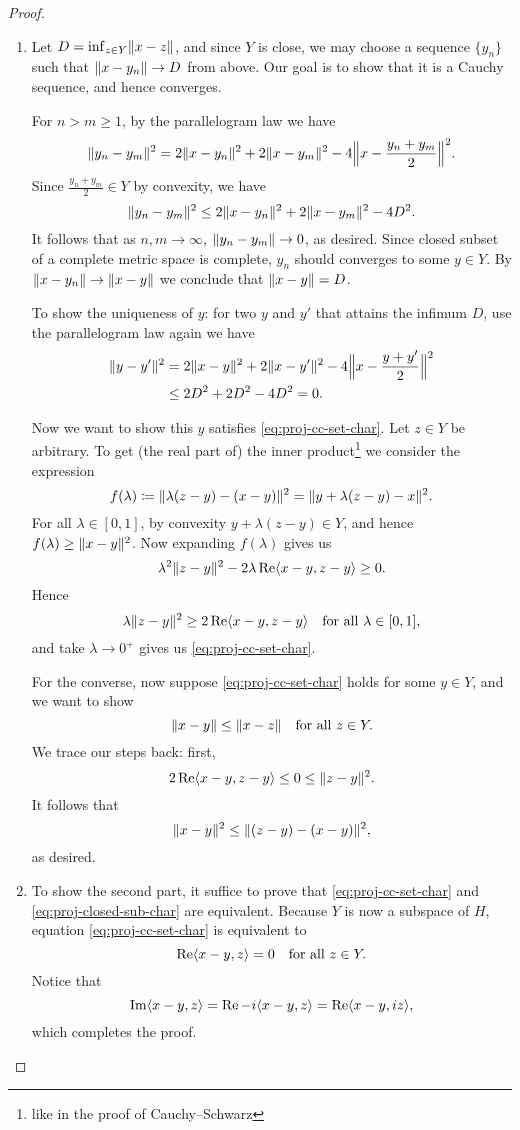 \begin{proof} \leavevmode
    \begin{enumerate}
        \item Let $D = \inf_{z\in Y}\lVert x-z \rVert$, and since $Y$ is close, we may choose a sequence $\{y_n\}$ such that $\lVert x - y_n \rVert \to D$ from above. Our goal is to show that it is a Cauchy sequence, and hence converges.

        For $n > m \geq 1$, by the parallelogram law we have \[
            \lVert y_n -y_m \rVert^2 = 2\lVert x - y_n \rVert^2 + 2 \lVert x - y_m \rVert^2 - 4 \Bigl\Vert x - \frac{y_n + y_m}{2} \Bigr\Vert^2.
        \] Since $\frac{y_n + y_m}{2} \in Y$ by convexity, we have \[
             \lVert y_n -y_m \rVert^2 \leq 2\lVert x - y_n \rVert^2 + 2 \lVert x - y_m \rVert^2 - 4D^2.
        \] It follows that as $n, m \to \infty$, $\lVert y_n - y_m \rVert\to 0$, as desired. Since closed subset of a complete metric space is complete, $y_n$ should converges to some $y \in Y$. By $\lVert x - y_n \rVert \to \lVert x - y \rVert$ we conclude that $\lVert x - y \rVert = D$.

        To show the uniqueness of $y$: for two $y$ and $y'$ that attains the infimum $D$, use the parallelogram law again we have \begin{align*}
            \lVert y -y' \rVert^2 & = 2\lVert x - y \rVert^2 + 2 \lVert x - y' \rVert^2 - 4 \Bigl\Vert x - \frac{y + y'}{2} \Bigr\Vert^2 \\
            & \leq 2D^2 + 2D^2 - 4D^2 = 0.
        \end{align*}
        
        Now we want to show this $y$ satisfies \eqref{eq:proj-cc-set-char}. Let $z \in Y$ be arbitrary. To get (the real part of) the inner product\footnote{like in the proof of Cauchy--Schwarz} we consider the expression \[
            f(\lambda) \coloneqq \lVert \lambda(z-y) - (x-y) \rVert^2 = \lVert y +\lambda(z - y)-x \rVert^2.
        \] For all $\lambda\in [0,1]$, by convexity $y + \lambda(z-y) \in Y$, and hence $f(\lambda) \geq \lVert x - y \rVert^2$. Now expanding $f(\lambda)$ gives us \[
            \lambda^2 \lVert z - y \rVert^2 - 2\lambda\operatorname{Re} \langle x-y, z-y \rangle \geq 0.
        \] Hence \[ \lambda \lVert z - y \rVert^2 \geq 2\operatorname{Re} \langle x-y, z-y \rangle \quad\text{for all }\lambda\in [0,1],
        \] and take $\lambda \to 0^+$ gives us \eqref{eq:proj-cc-set-char}.

        For the converse, now suppose \eqref{eq:proj-cc-set-char} holds for some $y \in Y$, and we want to show \[
            \lVert x - y \rVert \leq \lVert x - z \rVert\quad \text{for all }z\in Y.
        \] We trace our steps back: first, \[
            2\operatorname{Re} \langle x-y, z-y \rangle \leq 0\leq \lVert z - y \rVert^2.
        \] It follows that \[
            \lVert x - y \rVert^2 \leq \lVert (z - y) - (x - y) \rVert^2,
        \] as desired.
        \item To show the second part, it suffice to prove that \eqref{eq:proj-cc-set-char} and \eqref{eq:proj-closed-sub-char} are equivalent. Because $Y$ is now a subspace of $H$, equation \eqref{eq:proj-cc-set-char} is equivalent to \[
            \operatorname{Re}\langle x-y, z \rangle = 0\quad\text{for all }z\in Y.
        \] Notice that \[
            \operatorname{Im}\langle x-y, z \rangle = \operatorname{Re} -i\langle x-y, z \rangle = \operatorname{Re} \langle x-y, iz \rangle,
        \] which completes the proof. \qedhere
    \end{enumerate}
\end{proof}

